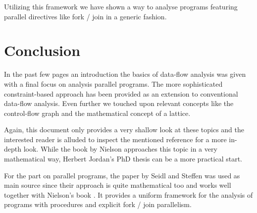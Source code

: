 \documentclass[article]{uibk}
\begin{document}
Utilizing this framework we have shown a way to analyse programs featuring
parallel directives like fork / join in a generic fashion.

\section{Conclusion}

In the past few pages an introduction the basics of data-flow analysis was
given with a final focus on analysis parallel programs. The more sophisticated
constraint-based approach has been provided as an extension to conventional
data-flow analysis. Even further we touched upon relevant concepts like the
control-flow graph and the mathematical concept of a lattice.

Again, this document only provides a very shallow look at these topics and the
interested reader is alluded to inspect the mentioned reference for a more
in-depth look. While the book by Nielson \cite{Nielson:ppa} approaches this
topic in a very mathematical way, Herbert Jordan's PhD thesis
\cite{herbert_phd} can be a more practical start.

For the part on parallel programs, the paper by Seidl and Steffen
\cite{parallel_cba} was used as main source since their approach is quite
mathematical too and works well together with Nielson's book
\cite{Nielson:ppa}. It provides a uniform framework for the analysis of
programs with procedures and explicit fork / join parallelism.

\newpage

\printbibliography
\end{document}
